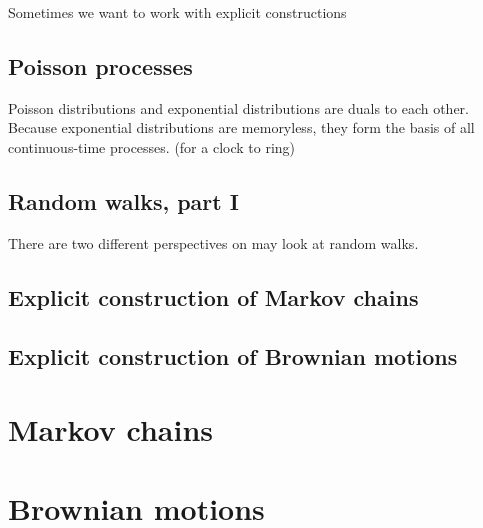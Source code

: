 \documentclass[10pt]{book}
\begin{document}
\begin{namedthm} \label{thm:ITET}
    
\end{namedthm}

\begin{namedthm} \label{thm:Kolmogorov-ext}
    
\end{namedthm}

\begin{namedthm}
    
\end{namedthm}


Sometimes we want to work with explicit constructions

\section{Poisson processes}
Poisson distributions and exponential distributions are duals to each other. Because exponential distributions are memoryless, they form the basis of all continuous-time processes. (for a clock to ring)

\begin{namedthm}
    
\end{namedthm}


\section{Random walks, part I}
There are two different perspectives on may look at random walks.

\section{Explicit construction of Markov chains}


\section{Explicit construction of Brownian motions}

\chapter{Markov chains}

\chapter{Brownian motions}




\appendix


\printbibliography[heading=bibintoc]

\printindex
\end{document}
